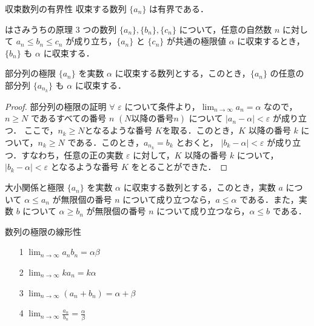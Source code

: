 \documentclass[a4paper]{ltjsarticle}
\begin{document}
  \begin{theorem}{収束数列の有界性}{}
   収束する数列 $\{a_n\}$ は有界である．
  \end{theorem}

  \begin{theorem}{はさみうちの原理}{}
   3 つの数列 $\{a_n\}, \{b_n\}, \{c_n\}$ について，任意の自然数 $n$ に対して $a_n \leq b_n \leq c_n$ が成り立ち，$\{a_n\}$ と $\{c_n\}$ が共通の極限値 $\alpha$ に収束するとき，$\{b_n\}$ も $\alpha$ に収束する．
  \end{theorem}

  \begin{theorem}{部分列の極限}{}
   $\{a_n\}$ を実数 $\alpha$ に収束する数列とする，このとき，$\{a_n\}$ の任意の部分列 $\{a_{n_k}\}$ も $\alpha$ に収束する．
  \end{theorem}

  \begin{proof}{部分列の極限の証明}{}
   $\forall$ $\varepsilon$ について条件より，$\lim_{n \to \infty} a_n = \alpha$ なので，$n \geq N$ であるすべての番号 $n$ $(N 以降の番号 n)$ について $|a_n - \alpha| < \varepsilon$ が成り立つ．
   ここで，$n_k \geq N $となるような番号 $K $を取る．このとき，$K$ 以降の番号 $k$ について，$n_k \geq N$ である．このとき，$a_{n_k} = b_k$ とおくと，
   $|b_k - \alpha| < \varepsilon$ が成り立つ．すなわち，任意の正の実数 $\varepsilon$ に対して，$K$ 以降の番号 $k$ について，$|b_k - \alpha| < \varepsilon$ となるような番号 $K$ をとることができた．
  \end{proof}

  \begin{theorem}{大小関係と極限}{}
   $\{a_n\}$ を実数 $\alpha$ に収束する数列とする，このとき，実数 $a$ について $\alpha \leq a_n$ が無限個の番号 $n$ について成り立つなら，$a \leq \alpha$ である．また，実数 $b$ について $\alpha \geq b_n$ が無限個の番号 $n$ について成り立つなら，$\alpha \leq b$ である．
  \end{theorem}

\pagebreak
  \begin{theorem}{数列の極限の線形性}{}
   \begin{itemize}
    \item[1 ] $\lim_{n \to \infty} a_n b_n = \alpha \beta$
    \item[2 ] $\lim_{n \to \infty} k a_n = k\alpha$
    \item[3 ] $\lim_{n \to \infty} (a_n + b_n) = \alpha + \beta$
    \item[4 ] $\lim_{n \to \infty} \frac{a_n}{b_n} = \frac{\alpha}{\beta}$
   \end{itemize}
  \end{theorem}
\end{document}
